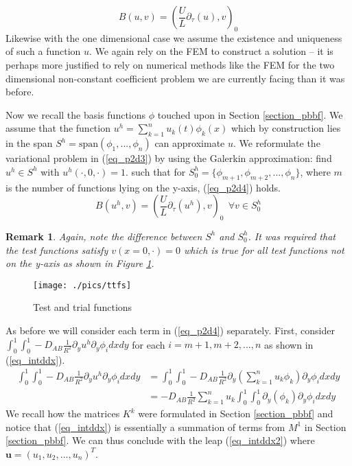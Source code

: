 \documentclass[11pt,fleqn]{article}
\theoremstyle{defstyle}
\newtheorem{rmrk}{Remark}[section]
\begin{document}
\begin{equation}
B(u,v) = (\frac{U}{L} \partial_\tau (u), v)_0
\label{eq_p2d3}
\end{equation}
Likewise with the one dimensional case we assume the existence and uniqueness of such a function $u$. We again rely on the FEM to construct a solution -- it is perhaps more justified to rely on numerical methods like the FEM for the two dimensional non-constant coefficient problem we are currently facing than it was before.

Now we recall the basis functions $\phi$ touched upon in Section \ref{section_pbbf}. We assume that the function $u^h =\sum^n_{k=1} u_k(t) \phi_k(x)$ which by construction lies in the span $S^h=\text{span}(\phi_1,...,\phi_n)$ can approximate $u$. We reformulate the variational problem in (\ref{eq_p2d3}) by using the Galerkin approximation: find $u^h \in S^h$ with $u^h(\cdot, 0,\cdot) = 1.$ such that for $S^h_0=\{\phi_{m+1}, \phi_{m+2},...,\phi_n \}$, where $m$ is the number of functions lying on the y-axis, (\ref{eq_p2d4}) holds.
\begin{equation}
B(u^h,v) = (\frac{U}{L} \partial_\tau (u^h), v)_0~~ \forall v \in S^h_0
\label{eq_p2d4}
\end{equation}
\begin{rmrk}
Again, note the difference between $S^h$ and $S^h_0$. It was required that the test functions satisfy $v(x=0,\cdot)=0$ which is true for all test functions not on the y-axis as shown in Figure \ref{fig_ttfs}. 
\end{rmrk}
\begin{figure}[H] 
\centering
\texttt{[image: ./pics/ttfs]}
\caption{Test and trial functions} 
\label{fig_ttfs}
\end{figure}
As before we will consider each term in (\ref{eq_p2d4}) separately. First, consider $ \int_0^1 \int_0^1 -D_{AB}\frac{1}{R^2}\partial_y u^h \partial_y \phi_i dxdy$ for each $i=m+1, m+2,...,n$ as shown in (\ref{eq_intddx}).
\begin{equation}
\begin{aligned}
\int_0^1 \int_0^1 -D_{AB}\frac{1}{R^2}\partial_y u^h \partial_y \phi_i dxdy &= \int_0^1 \int_0^1 -D_{AB}\frac{1}{R^2}\partial_y (\sum^n_{k=1} u_k \phi_k) \partial_y \phi_i dxdy \\
&= -D_{AB}\frac{1}{R^2}\sum^n_{k=1} u_k\int_0^1 \int_0^1 \partial_y (\phi_k) \partial_y \phi_i dxdy  
\end{aligned}
\label{eq_intddx}
\end{equation}
We recall how the matrices $K^k$ were formulated in Section \ref{section_pbbf} and notice that (\ref{eq_intddx}) is essentially a summation of terms from $M^1$ in Section \ref{section_pbbf}. We can thus conclude with the leap (\ref{eq_intddx2}) where $\mathbf{u} = \left(u_1,u_2,...,u_n\right)^T$.
\end{document}
